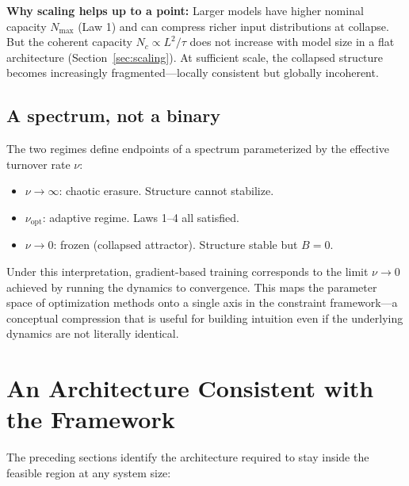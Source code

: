 \documentclass[12pt]{article}
\begin{document}
\textbf{Why scaling helps up to a point:} Larger models have higher nominal capacity $N_{\max}$ (Law 1) and can compress richer input distributions at collapse. But the coherent capacity $N_c \propto L^2/\tau$ does not increase with model size in a flat architecture (Section~\ref{sec:scaling}). At sufficient scale, the collapsed structure becomes increasingly fragmented---locally consistent but globally incoherent.

\subsection{A spectrum, not a binary}

The two regimes define endpoints of a spectrum parameterized by the effective turnover rate $\nu$:
\begin{itemize}
  \item $\nu \to \infty$: chaotic erasure. Structure cannot stabilize.
  \item $\nu_{\text{opt}}$: adaptive regime. Laws 1--4 all satisfied.
  \item $\nu \to 0$: frozen (collapsed attractor). Structure stable but $B = 0$.
\end{itemize}
Under this interpretation, gradient-based training corresponds to the limit $\nu \to 0$ achieved by running the dynamics to convergence. This maps the parameter space of optimization methods onto a single axis in the constraint framework---a conceptual compression that is useful for building intuition even if the underlying dynamics are not literally identical.

\section{An Architecture Consistent with the Framework}
\label{sec:proposal}

The preceding sections identify the architecture required to stay inside the feasible region at any system size:
\end{document}
